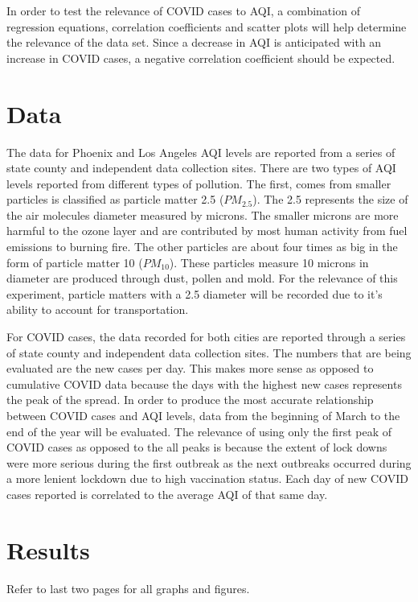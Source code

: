 \documentclass{article}
\begin{document}
\begin{doublespacing}
In order to test the relevance of COVID cases to AQI, a combination of regression equations, correlation coefficients and scatter plots will help determine the relevance of the data set. Since a decrease in AQI is anticipated with an increase in COVID cases, a negative correlation coefficient should be expected.

\section{Data}

The data for Phoenix and Los Angeles AQI levels are reported from a series of state county and independent data collection sites. There are two types of AQI levels reported from different types of pollution. The first, comes from smaller particles is classified as particle matter 2.5 ($PM_{2.5}$). The 2.5 represents the size of the air molecules diameter measured by microns. The smaller microns are more harmful to the ozone layer and are contributed by most human activity from fuel emissions to burning fire.  The other particles are about four times as big in the form of particle matter 10 ($PM_{10}$). These particles measure 10 microns in diameter are produced through dust, pollen and mold. For the relevance of this experiment, particle matters with a 2.5 diameter will be recorded due to it's ability to account for transportation. 

For COVID cases, the data recorded for both cities are reported through a series of state county and independent data collection sites. The numbers that are being evaluated are the new cases per day. This makes more sense as opposed to cumulative COVID data because the days with the highest new cases represents the peak of the spread. In order to produce the most accurate relationship between COVID cases and AQI levels, data from the beginning of March to the end of the year will be evaluated. The relevance of using only the first peak of COVID cases as opposed to the all peaks is because the extent of lock downs were more serious during the first outbreak as the next outbreaks occurred during a more lenient lockdown due to high vaccination status. Each day of new COVID cases reported is correlated to the average AQI of that same day. 


\section{Results}

Refer to last two pages for all graphs and figures.


\end{doublespacing}
\end{document}
